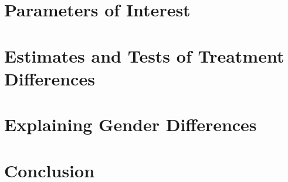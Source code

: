 \section{Parameters of Interest}
\label{sec:parameters}


\section{Estimates and Tests of Treatment Differences}
\label{sec:treatment-effects}


\section{Explaining Gender Differences}
\label{sec:gender-differences}


\section{Conclusion}
\label{sec:conclusion}


\singlespacing




